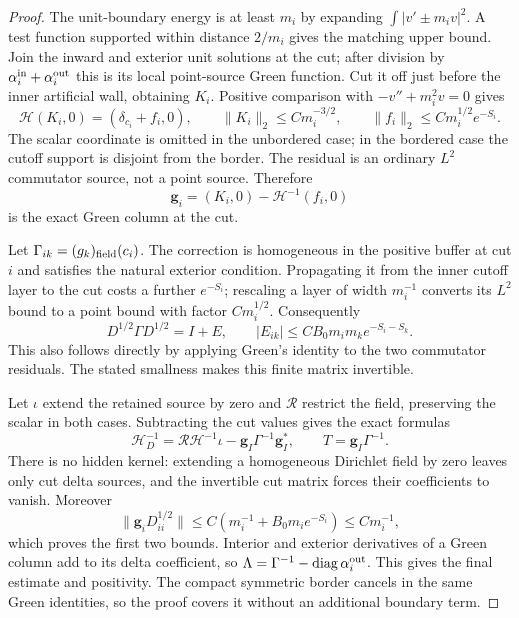 \begin{proof}
The unit-boundary energy is at least $m_i$ by expanding
$\int|v'\pm m_iv|^2$.  A test function supported within distance
$2/m_i$ gives the matching upper bound.  Join the inward and exterior
unit solutions at the cut; after division by
$\alpha_i^{\rm in}+\alpha_i^{\rm out}$ this is its local point-source
Green function.  Cut it off just before the inner artificial wall,
obtaining $K_i$.  Positive comparison with $-v''+m_i^2v=0$ gives
\[
 \mathcal H(K_i,0)=(\delta_{c_i}+f_i,0),\qquad
 \|K_i\|_2\le Cm_i^{-3/2},\qquad
 \|f_i\|_2\le Cm_i^{1/2}e^{-S_i}.
\]
The scalar coordinate is omitted in the unbordered case; in the bordered
case the cutoff support is disjoint from the border.  The residual is
an ordinary $L^2$ commutator source, not a point source.  Therefore
\[
 \boldsymbol g_i=(K_i,0)-\mathcal H^{-1}(f_i,0)
\]
is the exact Green column at the cut.

Let $\Gamma_{ik}=(g_k)_{\rm field}(c_i)$.  The correction is homogeneous
in the positive buffer at cut $i$ and satisfies the natural exterior
condition.  Propagating it from the inner cutoff layer to the cut costs
a further $e^{-S_i}$; rescaling a layer of width $m_i^{-1}$ converts
its $L^2$ bound to a point bound with factor $Cm_i^{1/2}$.
Consequently
\[
 D^{1/2}\Gamma D^{1/2}=I+E,\qquad
 |E_{ik}|\le CB_0m_im_ke^{-S_i-S_k}.
\]
This also follows directly by applying Green's identity to the two
commutator residuals.  The stated smallness makes this finite matrix
invertible.

Let $\iota$ extend the retained source by zero and $\mathcal R$ restrict
the field, preserving the scalar in both cases.  Subtracting the cut
values gives the exact formulas
\[
 \mathcal H_D^{-1}=\mathcal R\mathcal H^{-1}\iota
                     -\boldsymbol g_I\Gamma^{-1}\boldsymbol g_I^*,
 \qquad T=\boldsymbol g_I\Gamma^{-1}.
\]
There is no hidden kernel: extending a homogeneous Dirichlet field by
zero leaves only cut delta sources, and the invertible cut matrix forces
their coefficients to vanish.  Moreover
\[
 \|\boldsymbol g_iD_{ii}^{1/2}\|
 \le C(m_i^{-1}+B_0m_ie^{-S_i})\le Cm_i^{-1},
\]
which proves the first two bounds.  Interior and exterior derivatives
of a Green column add to its delta coefficient, so
$\Lambda=\Gamma^{-1}-\operatorname{diag}\alpha_i^{\rm out}$.
This gives the final estimate and positivity.  The compact symmetric
border cancels in the same Green identities, so the proof covers it
without an additional boundary term.
\end{proof}

